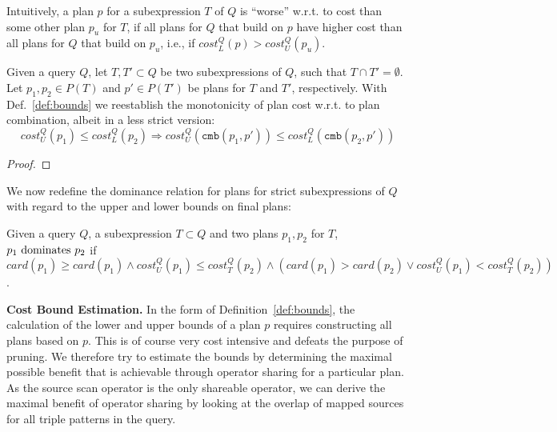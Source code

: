 Intuitively, a plan $p$ for a subexpression $T$ of $Q$ is ``worse''
w.r.t. to cost than some other plan $p_u$ for $T$, if all plans for
$Q$ that build on $p$ have higher cost than all plans for $Q$ that
build on $p_u$, i.e., if $cost_L^Q(p) > cost_U^Q(p_u)$.

\begin{theorem}
  Given a query $Q$, let $T,T' \subset Q$ be two subexpressions of
  $Q$, such that $T \cap T' = \emptyset$. Let $p_1,p_2 \in P(T)$ and
  $p' \in P(T')$ be plans for $T$ and $T'$, respectively. With
  Def.~\ref{def:bounds} we reestablish the monotonicity of plan cost
    w.r.t. to plan combination, albeit in a less strict version:
    \[ cost^Q_U(p_1) \leq cost^Q_L(p_2) \Rightarrow
    cost^Q_U(\mathtt{cmb}(p_1,p')) \leq
    cost^Q_L(\mathtt{cmb}(p_2,p')) \]
\end{theorem}
\begin{proof}
  
\end{proof}

We now redefine the dominance relation for plans for strict
subexpressions of $Q$ with regard to the upper and lower bounds on
final plans:

\begin{definition}
  \label{def:dominates_bound}
  Given a query $Q$, a subexpression $T \subset Q$ and two plans
  $p_1,p_2$ for $T$, $p_1 \mbox{ \textnormal{dominates} } p_2$ if
  $card(p_1) \geq card(p_1) \wedge cost_U^Q(p_1) \leq cost_T^Q(p_2)
  \wedge (card(p_1) > card(p_2) \vee cost_U^Q(p_1) < cost_T^Q(p_2))$.
\end{definition}



\textbf{Cost Bound Estimation.} In the form of
Definition~\ref{def:bounds}, the calculation of the lower and upper
bounds of a plan $p$ requires constructing all plans based on
$p$. This is of course very cost intensive and defeats the purpose of
pruning. We therefore try to estimate the bounds by determining the
maximal possible benefit that is achievable through operator sharing
for a particular plan. As the source scan operator is the only
shareable operator, we can derive the maximal benefit of operator
sharing by looking at the overlap of mapped sources for all triple
patterns in the query.

